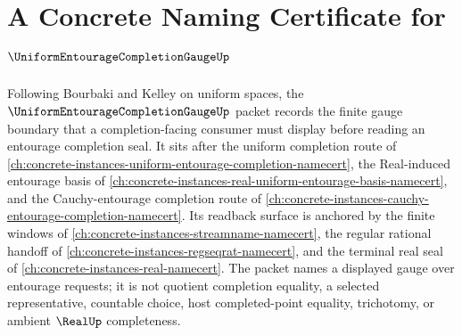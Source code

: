 \chapter{A Concrete Naming Certificate for $\UniformEntourageCompletionGaugeUp$}
\label{ch:concrete-instances-uniform-entourage-completion-gauge-namecert}

Following Bourbaki and Kelley on uniform spaces, the $\UniformEntourageCompletionGaugeUp$ packet records the finite gauge boundary that a completion-facing consumer must display before reading an entourage completion seal. It sits after the uniform completion route of \autoref{ch:concrete-instances-uniform-entourage-completion-namecert}, the Real-induced entourage basis of \autoref{ch:concrete-instances-real-uniform-entourage-basis-namecert}, and the Cauchy-entourage completion route of \autoref{ch:concrete-instances-cauchy-entourage-completion-namecert}. Its readback surface is anchored by the finite windows of \autoref{ch:concrete-instances-streamname-namecert}, the regular rational handoff of \autoref{ch:concrete-instances-regseqrat-namecert}, and the terminal real seal of \autoref{ch:concrete-instances-real-namecert}. The packet names a displayed gauge over entourage requests; it is not quotient completion equality, a selected representative, countable choice, host completed-point equality, trichotomy, or ambient $\RealUp$ completeness.

